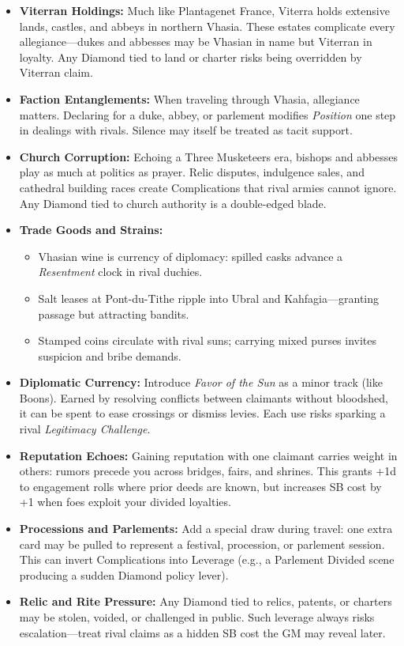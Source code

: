 \begin{itemize}
\item \textbf{Viterran Holdings:} Much like Plantagenet France, Viterra holds extensive lands, castles, and abbeys in northern Vhasia. These estates complicate every allegiance—dukes and abbesses may be Vhasian in name but Viterran in loyalty. Any Diamond tied to land or charter risks being overridden by Viterran claim.
\item \textbf{Faction Entanglements:} When traveling through Vhasia, allegiance matters. Declaring for a duke, abbey, or parlement modifies \emph{Position} one step in dealings with rivals. Silence may itself be treated as tacit support.
\item \textbf{Church Corruption:} Echoing a Three Musketeers era, bishops and abbesses play as much at politics as prayer. Relic disputes, indulgence sales, and cathedral building races create Complications that rival armies cannot ignore. Any Diamond tied to church authority is a double-edged blade.
\item \textbf{Trade Goods and Strains:} 
  \begin{itemize}
    \item Vhasian wine is currency of diplomacy: spilled casks advance a \emph{Resentment} clock in rival duchies.
    \item Salt leases at Pont-du-Tithe ripple into Ubral and Kahfagia—granting passage but attracting bandits.
    \item Stamped coins circulate with rival suns; carrying mixed purses invites suspicion and bribe demands.
  \end{itemize}
\item \textbf{Diplomatic Currency:} Introduce \emph{Favor of the Sun} as a minor track (like Boons). Earned by resolving conflicts between claimants without bloodshed, it can be spent to ease crossings or dismiss levies. Each use risks sparking a rival \emph{Legitimacy Challenge}.
\item \textbf{Reputation Echoes:} Gaining reputation with one claimant carries weight in others: rumors precede you across bridges, fairs, and shrines. This grants +1d to engagement rolls where prior deeds are known, but increases SB cost by +1 when foes exploit your divided loyalties.
\item \textbf{Processions and Parlements:} Add a special draw during travel: one extra card may be pulled to represent a festival, procession, or parlement session. This can invert Complications into Leverage (e.g., a Parlement Divided scene producing a sudden Diamond policy lever).
\item \textbf{Relic and Rite Pressure:} Any Diamond tied to relics, patents, or charters may be stolen, voided, or challenged in public. Such leverage always risks escalation—treat rival claims as a hidden SB cost the GM may reveal later.
\end{itemize}

